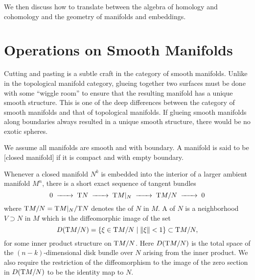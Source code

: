 We then discuss how to translate between the algebra of homology and cohomology and the geometry of manifolds and embeddings.



\pagebreak
\section{Operations on Smooth Manifolds}\label{sec:geometric-topology}

Cutting and pasting is a subtle craft in the category of smooth manifolds. 
Unlike in the topological manifold category, glueing together two surfaces must be done with some ``wiggle room'' to ensure that the resulting manifold has a unique smooth structure. This is one of the deep differences between the category of smooth manifolds and that of topological manifolds. If glueing smooth manifolds along boundaries always resulted in a unique smooth structure, there would be no exotic spheres.

\begin{convention*}
	We assume all manifolds are smooth and with boundary. A manifold is said to be [closed manifold] if it is compact and with empty boundary.
\end{convention*}

Whenever a closed manifold $N^k$ is embedded into the interior of a larger ambient manifold $M^n$, there is a short exact sequence of tangent bundles
\begin{equation}
	0 \lkxto \T N\lkxto \T M|_N \lkxto \T M/N \lkxto 0
\end{equation}
where $\mathrm{T} M/N=\mathrm{T} M|_N / \mathrm{T} N$ denotes the  of $N$ in $M$. A  of $N$ is a neighborhood $V\supset N$ in $M$ which is the diffeomorphic image of the set
\begin{equation}
	D(\mathrm{T} M/N) = \{\xi \in \mathrm{T} M/N \mid \|\xi\| <1 \}\subset \mathrm{T} M/N,
\end{equation}
for some inner product structure on $\mathrm{T} M/N$. Here $D(\mathrm{T} M/N)$ is the total space of the $(n-k)$-dimensional disk bundle over $N$ arising from the inner product. We also require the restriction of the diffeomorphism to the image of the zero section in $D(\mathrm{T} M/N)$ to be the identity map to $N$.

